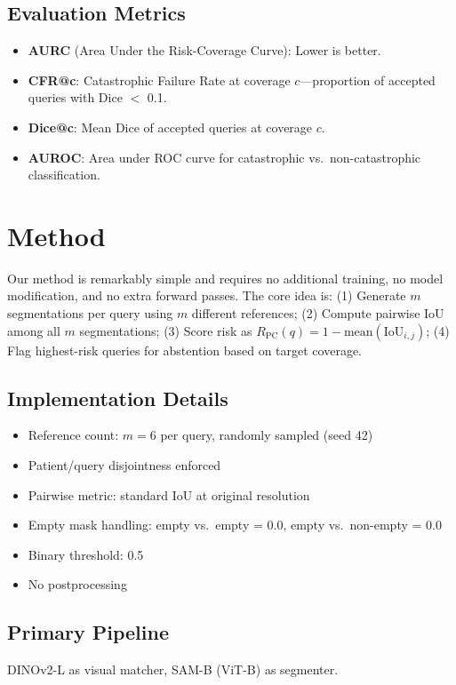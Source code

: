 \documentclass[11pt]{article}
\newcommand{\RPC}{R_{\text{PC}}}
\begin{document}
\subsection{Evaluation Metrics}
\begin{itemize}[leftmargin=*]
\item \textbf{AURC} (Area Under the Risk-Coverage Curve): Lower is better.
\item \textbf{CFR@c}: Catastrophic Failure Rate at coverage $c$---proportion of accepted 
queries with Dice $<$ 0.1.
\item \textbf{Dice@c}: Mean Dice of accepted queries at coverage $c$.
\item \textbf{AUROC}: Area under ROC curve for catastrophic vs.\ non-catastrophic classification.
\end{itemize}

\section{Method}

Our method is remarkably simple and requires no additional training, no model modification, 
and no extra forward passes. The core idea is: (1) Generate $m$ segmentations per query using 
$m$ different references; (2) Compute pairwise IoU among all $m$ segmentations; 
(3) Score risk as $\RPC(q) = 1 - \text{mean}(\text{IoU}_{i,j})$; (4) Flag highest-risk 
queries for abstention based on target coverage.

\subsection{Implementation Details}
\begin{itemize}[leftmargin=*]
\item Reference count: $m = 6$ per query, randomly sampled (seed 42)
\item Patient/query disjointness enforced
\item Pairwise metric: standard IoU at original resolution
\item Empty mask handling: empty vs.\ empty = 0.0, empty vs.\ non-empty = 0.0
\item Binary threshold: 0.5
\item No postprocessing
\end{itemize}

\subsection{Primary Pipeline}
DINOv2-L as visual matcher, SAM-B (ViT-B) as segmenter.
\end{document}
